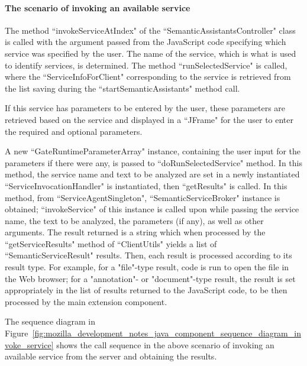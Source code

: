 \paragraph{The scenario of invoking an available service} The method ``invokeServiceAtIndex" of the ``SemanticAssistantsController" class is called with the argument passed from the JavaScript code specifying which service was specified by the user. The name of the service, which is what is used to identify services, is determined. The method ``runSelectedService" is called, where the ``ServiceInfoForClient" corresponding to the service is retrieved from the list saving during the ``startSemanticAssistants" method call. 

If this service has parameters to be entered by the user, these parameters are retrieved based on the service and displayed in a ``JFrame" for the user to enter the required and optional parameters. 

A new ``GateRuntimeParameterArray" instance, containing the user input for the parameters if there were any, is passed to ``doRunSelectedService" method. In this method, the service name and text to be analyzed are set in a newly instantiated ``ServiceInvocationHandler" is instantiated, then ``getResults" is called. In this method, from ``ServiceAgentSingleton", ``SemanticServiceBroker" instance is obtained; ``invokeService" of this instance is called upon while passing the service name, the text to be analyzed, the parameters (if any), as well as other arguments. The result returned is a string which when processed by the ``getServiceResults" method of ``ClientUtils" yields a list of ``SemanticServiceResult" results. Then, each result is processed according to its result type. For example, for a "file"-type result, code is run to open the file in the Web browser; for a "annotation"- or "document"-type result, the result is set appropriately in the list of results returned to the JavaScript code, to be then processed by the main extension component. 

The sequence diagram in Figure~\ref{fig:mozilla_development_notes_java_component_sequence_diagram_invoke_service} shows the call sequence in the above scenario of invoking an available service from the server and obtaining the results. 

